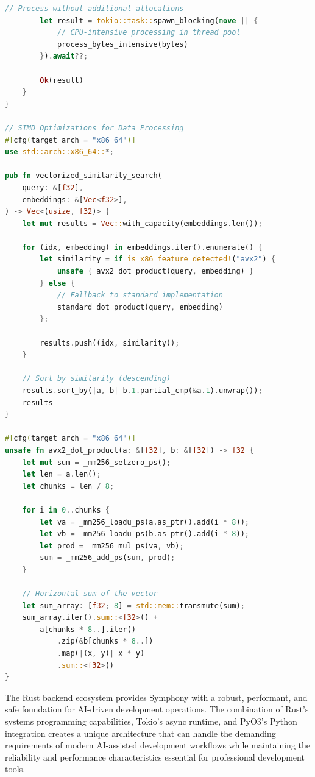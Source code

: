 \begin{lstlisting}[language=Rust, caption=Performance Optimization Strategies]
        // Process without additional allocations
        let result = tokio::task::spawn_blocking(move || {
            // CPU-intensive processing in thread pool
            process_bytes_intensive(bytes)
        }).await??;
        
        Ok(result)
    }
}

// SIMD Optimizations for Data Processing
#[cfg(target_arch = "x86_64")]
use std::arch::x86_64::*;

pub fn vectorized_similarity_search(
    query: &[f32],
    embeddings: &[Vec<f32>],
) -> Vec<(usize, f32)> {
    let mut results = Vec::with_capacity(embeddings.len());
    
    for (idx, embedding) in embeddings.iter().enumerate() {
        let similarity = if is_x86_feature_detected!("avx2") {
            unsafe { avx2_dot_product(query, embedding) }
        } else {
            // Fallback to standard implementation
            standard_dot_product(query, embedding)
        };
        
        results.push((idx, similarity));
    }
    
    // Sort by similarity (descending)
    results.sort_by(|a, b| b.1.partial_cmp(&a.1).unwrap());
    results
}

#[cfg(target_arch = "x86_64")]
unsafe fn avx2_dot_product(a: &[f32], b: &[f32]) -> f32 {
    let mut sum = _mm256_setzero_ps();
    let len = a.len();
    let chunks = len / 8;
    
    for i in 0..chunks {
        let va = _mm256_loadu_ps(a.as_ptr().add(i * 8));
        let vb = _mm256_loadu_ps(b.as_ptr().add(i * 8));
        let prod = _mm256_mul_ps(va, vb);
        sum = _mm256_add_ps(sum, prod);
    }
    
    // Horizontal sum of the vector
    let sum_array: [f32; 8] = std::mem::transmute(sum);
    sum_array.iter().sum::<f32>() + 
        a[chunks * 8..].iter()
            .zip(&b[chunks * 8..])
            .map(|(x, y)| x * y)
            .sum::<f32>()
}
\end{lstlisting}

The Rust backend ecosystem provides Symphony with a robust, performant, and safe foundation for AI-driven development operations. The combination of Rust's systems programming capabilities, Tokio's async runtime, and PyO3's Python integration creates a unique architecture that can handle the demanding requirements of modern AI-assisted development workflows while maintaining the reliability and performance characteristics essential for professional development tools.